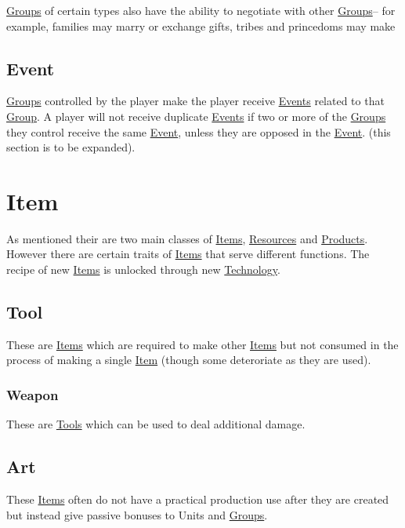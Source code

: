 \documentclass[11pt]{article}
\begin{document}
\hyperref[org21e4d88]{Groups} of certain types also have the ability to negotiate with other \hyperref[org21e4d88]{Groups}-- for example, families may marry or exchange gifts, tribes and princedoms may make\\
\subsection{Event \label{orga67caa8} \label{org18f01fc}}
\label{sec:org2a721ff}
\hyperref[org21e4d88]{Groups} controlled by the player make the player receive \hyperref[org18f01fc]{Events} related to that \hyperref[org3bac9f0]{Group}. A player will not receive duplicate \hyperref[org18f01fc]{Events} if two or more of the \hyperref[org21e4d88]{Groups} they control receive the same \hyperref[orga67caa8]{Event}, unless they are opposed in the \hyperref[orga67caa8]{Event}. (this section is to be expanded).\\
\section{Item \label{org1f7c3b7} \label{org4612467}}
\label{sec:orgf1eb167}
As mentioned their are two main classes of \hyperref[org4612467]{Items}, \hyperref[orgd69054e]{Resources} and \hyperref[orgc5e54a9]{Products}. However there are certain traits of \hyperref[org4612467]{Items} that serve different functions.  The recipe of new \hyperref[org4612467]{Items} is unlocked through new \hyperref[org85e435a]{Technology}.\\
\subsection{Tool \label{orgbc87442} \label{org55856a5}}
\label{sec:org7a7343d}
These are \hyperref[org4612467]{Items} which are required to make other \hyperref[org4612467]{Items} but not consumed in the process of making a single \hyperref[org1f7c3b7]{Item} (though some  deteroriate as they are used).\\
\subsubsection{Weapon}
\label{sec:org461ded4}
These are \hyperref[org55856a5]{Tools} which can be used to deal additional damage.\\
\subsection{Art \label{org978f042} \label{org19e03dc}}
\label{sec:orgc13e73d}
These \hyperref[org4612467]{Items} often do not have a practical production use after they are created but instead give passive bonuses to Units and \hyperref[org21e4d88]{Groups}.\\
\end{document}
